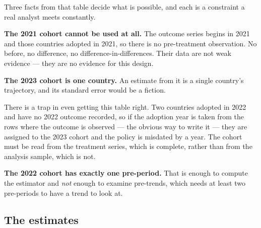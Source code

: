 \documentclass[
  letterpaper,
  10pt,
  twoside,
  openright,
  numbers=noenddot,
  chapterprefix=true]{scrbook}
\begin{document}
Three facts from that table decide what is possible, and each is a
constraint a real analyst meets constantly.

\textbf{The 2021 cohort cannot be used at all.} The outcome series
begins in 2021 and those countries adopted in 2021, so there is no
pre-treatment observation. No before, no difference, no
difference-in-differences. Their data are not weak evidence --- they are
no evidence for this design.

\textbf{The 2023 cohort is one country.} An estimate from it is a single
country's trajectory, and its standard error would be a fiction.

There is a trap in even getting this table right. Two countries adopted
in 2022 and have no 2022 outcome recorded, so if the adoption year is
taken from the rows where the outcome is observed --- the obvious way to
write it --- they are assigned to the 2023 cohort and the policy is
misdated by a year. The cohort must be read from the treatment series,
which is complete, rather than from the analysis sample, which is not.

\textbf{The 2022 cohort has exactly one pre-period.} That is enough to
compute the estimator and \emph{not} enough to examine pre-trends, which
needs at least two pre-periods to have a trend to look at.

\subsection{The estimates}\label{the-estimates}
\end{document}
